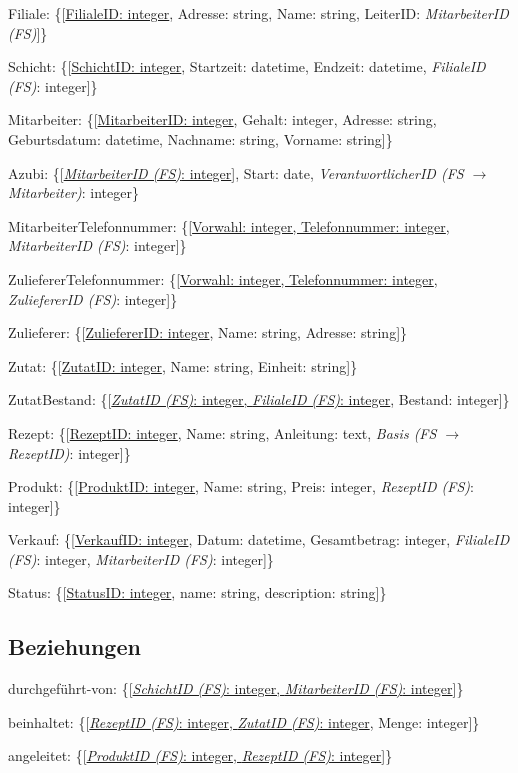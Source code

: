 \documentclass[a4paper]{article}
\begin{document}
Filiale: \{[\underline{FilialeID: integer}, Adresse: string, Name: string, LeiterID: \textit{MitarbeiterID (FS)}]\}

Schicht: \{[\underline{SchichtID: integer}, Startzeit: datetime, Endzeit: datetime, \textit{FilialeID (FS)}: integer]\}

Mitarbeiter: \{[\underline{MitarbeiterID: integer}, Gehalt: integer, Adresse: string, Geburtsdatum: datetime, Nachname: string, Vorname: string]\}

Azubi: \{[\underline{\textit{MitarbeiterID (FS)}: integer}], Start: date, \textit{VerantwortlicherID (FS $\to$ Mitarbeiter)}: integer\}

MitarbeiterTelefonnummer: \{[\underline{Vorwahl: integer, Telefonnummer: integer}, \textit{MitarbeiterID (FS)}: integer]\}

ZuliefererTelefonnummer: \{[\underline{Vorwahl: integer, Telefonnummer: integer}, \textit{ZuliefererID (FS)}: integer]\}

Zulieferer: \{[\underline{ZuliefererID: integer}, Name: string, Adresse: string]\}

Zutat: \{[\underline{ZutatID: integer}, Name: string, Einheit: string]\}

ZutatBestand: \{[\underline{\textit{ZutatID (FS)}: integer, \textit{FilialeID (FS)}: integer}, Bestand: integer]\}

Rezept: \{[\underline{RezeptID: integer}, Name: string, Anleitung: text, \textit{Basis (FS $\to$ RezeptID)}: integer]\}

Produkt: \{[\underline{ProduktID: integer}, Name: string, Preis: integer, \textit{RezeptID (FS)}: integer]\}

Verkauf: \{[\underline{VerkaufID: integer}, Datum: datetime, Gesamtbetrag: integer, \textit{FilialeID (FS)}: integer, \textit{MitarbeiterID (FS)}: integer]\}

Status: \{[\underline{StatusID: integer}, name: string, description: string]\}

\subsection{Beziehungen}

durchgeführt-von: \{[\underline{\textit{SchichtID (FS)}: integer, \textit{MitarbeiterID (FS)}: integer}]\}

beinhaltet: \{[\underline{\textit{RezeptID (FS)}: integer, \textit{ZutatID (FS)}: integer}, Menge: integer]\}

angeleitet: \{[\underline{\textit{ProduktID (FS)}: integer, \textit{RezeptID (FS)}: integer}]\}
\end{document}
